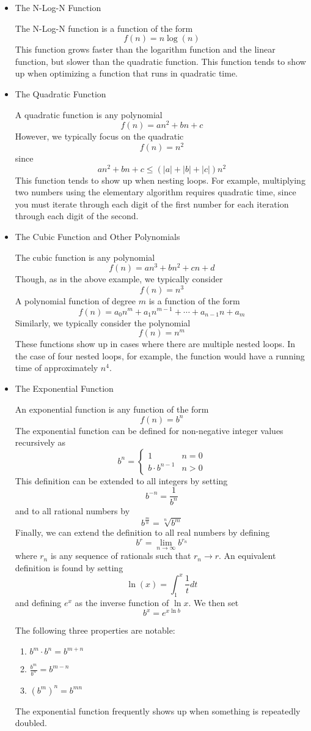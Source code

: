 \documentclass[a4paper]{article}
\begin{document}
\begin{itemize}
  \item The N-Log-N Function

  The N-Log-N function is a function of the form \[f(n)=n\log(n)\] This function grows faster than the logarithm function and the linear function, but slower than the quadratic function. This function tends to show up when optimizing a function that runs in quadratic time.
  \item The Quadratic Function

  A quadratic function is any polynomial \[f(n) = an^2+bn+c\] However, we typically focus on the quadratic \[f(n) = n^2\] since \[an^2+bn+c\leq\left(|a|+|b|+|c|\right)n^2\] This function tends to show up when nesting loops. For example, multiplying two numbers using the elementary algorithm requires quadratic time, since you must iterate through each digit of the first number for each iteration through each digit of the second.

  \item The Cubic Function and Other Polynomials

  The cubic function is any polynomial \[f(n)=an^3+bn^2+cn+d\] Though, as in the above example, we typically consider \[f(n) = n^3\] A polynomial function of degree $m$ is a function of the form \[f(n)=a_0n^m+a_1n^{m-1}+\cdots+a_{n-1}n+a_m\] Similarly, we typically consider the polynomial \[f(n)=n^m\] These functions show up in cases where there are multiple nested loops. In the case of four nested loops, for example, the function would have a running time of approximately $n^4$.

  \item The Exponential Function

  An exponential function is any function of the form \[f(n)=b^n\] The exponential function can be defined for non-negative integer values recursively as \[b^n=\begin{cases}1 & n = 0\\b\cdot b^{n-1} & n>0\end{cases}\] This definition can be extended to all integers by setting \[b^{-n}=\frac{1}{b^n}\] and to all rational numbers by \[b^{\frac{m}{n}}=\sqrt[n]{b^m}\] Finally, we can extend the definition to all real numbers by defining \[b^r=\lim_{n\to\infty}b^{r_n}\] where $r_n$ is any sequence of rationals such that $r_n\to r$. An equivalent definition is found by setting \[\ln(x)=\int_1^x\frac{1}{t}dt\] and defining $e^x$ as the inverse function of $\ln{x}$. We then set \[b^x=e^{x\ln{b}}\]

  The following three properties are notable:
  \begin{enumerate}
  \item $b^m\cdot b^n=b^{m+n}$
  \item $\frac{b^m}{b^n}=b^{m-n}$
  \item $(b^m)^n=b^{mn}$
  \end{enumerate}

The exponential function frequently shows up when something is repeatedly doubled.
\end{itemize}
\end{document}
